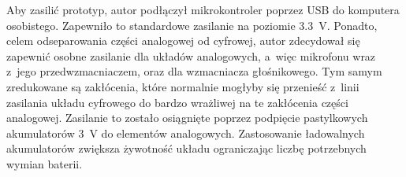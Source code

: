 Aby zasilić prototyp, autor podłączył mikrokontroler poprzez USB do komputera osobistego. Zapewniło to standardowe zasilanie na poziomie \SI{3.3}{\V}. Ponadto, celem odseparowania części analogowej od cyfrowej, autor zdecydował się zapewnić osobne zasilanie dla układów analogowych, a~więc mikrofonu wraz z~jego przedwzmacniaczem, oraz dla wzmacniacza głośnikowego. Tym samym zredukowane są zakłócenia, które normalnie mogłyby się przenieść z~linii zasilania układu cyfrowego do bardzo wrażliwej na te zakłócenia części analogowej. Zasilanie to zostało osiągnięte poprzez podpięcie pastylkowych akumulatorów \SI{3}{\V} do elementów analogowych. Zastosowanie ładowalnych akumulatorów zwiększa żywotność układu ograniczając liczbę potrzebnych wymian baterii.
